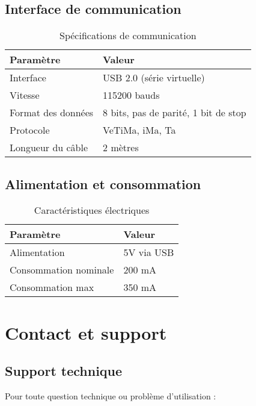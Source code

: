 \documentclass[12pt,a4paper]{article}
\begin{document}
\subsection{Interface de communication}

\begin{table}[H]
\centering
\begin{tabular}{|l|l|}
\hline
\textbf{Paramètre} & \textbf{Valeur} \\
\hline
Interface & USB 2.0 (série virtuelle) \\
\hline
Vitesse & 115200 bauds \\
\hline
Format des données & 8 bits, pas de parité, 1 bit de stop \\
\hline
Protocole & VeTiMa, iMa, Ta \\
\hline
Longueur du câble & 2 mètres \\
\hline
\end{tabular}
\caption{Spécifications de communication}
\label{tab:specs_comm}
\end{table}

\subsection{Alimentation et consommation}

\begin{table}[H]
\centering
\begin{tabular}{|l|l|}
\hline
\textbf{Paramètre} & \textbf{Valeur} \\
\hline
Alimentation & 5V via USB \\
\hline
Consommation nominale & 200 mA \\
\hline
Consommation max & 350 mA \\
\hline
\end{tabular}
\caption{Caractéristiques électriques}
\label{tab:specs_elec}
\end{table}

\section{Contact et support}

\subsection{Support technique}

Pour toute question technique ou problème d'utilisation :
\end{document}
